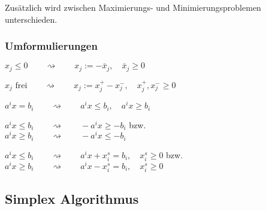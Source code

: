     Zusätzlich wird zwischen Maximierungs- und Minimierungsproblemen unterschieden.
    
  \subsubsection{Umformulierungen }
    \begin{aufzaehlung}
      \item $x_j \leq 0 \qquad \rightsquigarrow \qquad x_j := -\bar{x}_j, \quad \bar{x}_j \geq 0$
      \item $x_j \text{ frei} \qquad \rightsquigarrow \qquad x_j := x_j^+ - x_j^-, \quad x_j^+, x_j^- \geq 0$
      \item $a^i x = b_i \qquad \rightsquigarrow \qquad a^i x \leq b_i, \quad a^i x \geq b_i$
      \item $a^i x \leq b_i \qquad \rightsquigarrow \qquad -a^i x \geq -b_i$ bzw.\\
            $a^i x \geq b_i \qquad \rightsquigarrow \qquad -a^i x \leq -b_i$
      \item $a^i x \leq b_i \qquad \rightsquigarrow \qquad a^i x + x_i^s = b_i, \quad x_i^s \geq 0$ bzw.\\
            $a^i x \geq b_i \qquad \rightsquigarrow \qquad a^i x - x_i^s = b_i, \quad x_i^s \geq 0$
    \end{aufzaehlung}
  

\subsection{Simplex Algorithmus}

